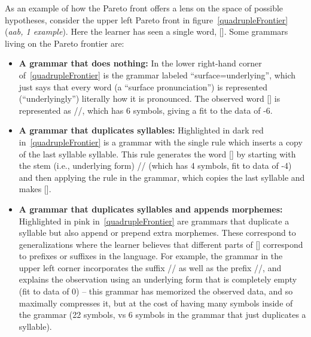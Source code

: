 \documentclass{article}
\begin{document}
As an example of how the Pareto front offers a lens on the
space of possible hypotheses,
consider the upper left Pareto front in figure~\ref{quadrupleFrontier} (\emph{aab, 1 example}).
Here the learner has seen a single word, [].
Some grammars living on the Pareto frontier are:
\begin{itemize}
\item \textbf{A grammar that does nothing:} In the lower right-hand corner of~\ref{quadrupleFrontier}
  is the grammar labeled ``surface=underlying'',
  which just says that every word (a ``surface pronunciation'')
  is represented (``underlyingly'') literally how it is pronounced.
  The observed word [] is represented as //, which has 6 symbols,
  giving a fit to the data of -6.
\item \textbf{A grammar that duplicates syllables:} Highlighted in dark red in~\ref{quadrupleFrontier}
  is a grammar with the single rule
  which inserts a copy of the last syllable syllable.
  This rule generates the word [] by starting with the stem (i.e., underlying form) // (which has 4 symbols, fit to data of -4) and then applying the rule in the grammar,
  which copies the last syllable and makes [].
\item \textbf{A grammar that duplicates syllables and appends
  morphemes:} Highlighted in pink in~\ref{quadrupleFrontier} are
  grammars that duplicate a syllable but also append or prepend extra
  morphemes.  These correspond to generalizations where the learner
  believes that different parts of [] correspond to
  prefixes or suffixes in the language.  For example, the grammar in
  the upper left corner incorporates the suffix // as well
  as the prefix //, and explains the observation using an
  underlying form that is completely empty (fit to data of 0) -- this
  grammar has memorized the observed data, and so maximally compresses
  it, but at the cost of having many symbols inside of the grammar (22 symbols, vs 6 symbols in the grammar that just duplicates a syllable).  
  \end{itemize}
\end{document}

